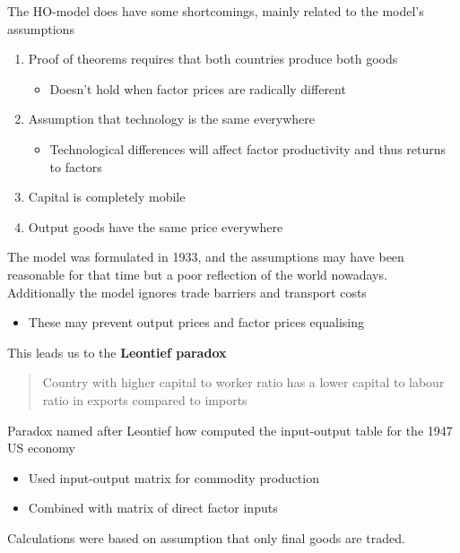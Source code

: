 \documentclass{beamer}
\begin{document}
\begin{frame}
  The HO-model does have some shortcomings, mainly related to the model's assumptions
  \begin{enumerate} 
    \item Proof of theorems requires that both countries produce both goods
    \begin{itemize}
      \item Doesn't hold when factor prices are radically different
    \end{itemize}
    \item Assumption that technology is the same everywhere
    \begin{itemize}
      \item Technological differences will affect factor productivity and thus returns to factors
    \end{itemize}
    \item Capital is completely mobile
    \item Output goods have the same price everywhere
  \end{enumerate}
  The model was formulated in 1933, and the assumptions may have been reasonable for that time but a poor reflection of the world nowadays.\\
  \bigskip
  Additionally the model ignores trade barriers and transport costs
  \begin{itemize}
    \item These may prevent output prices and factor prices equalising
  \end{itemize}
\end{frame}

\begin{frame}
 This leads us to the \textbf{Leontief paradox}
 \begin{quote}
  Country with higher capital to worker ratio has a lower capital to labour ratio in exports compared to imports
 \end{quote}
\end{frame}

\begin{frame}
  Paradox named after Leontief how computed the input-output table for the 1947 US economy
  \begin{itemize}
    \item Used input-output matrix for commodity production
    \item Combined with matrix of direct factor inputs
  \end{itemize}
  \medskip
  Calculations were based on assumption that only final goods are traded.
\end{frame}
\end{document}
